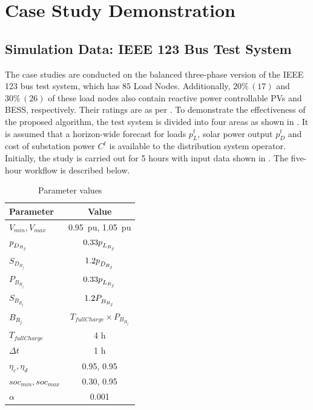 \documentclass[../../outputs/main.tex]{subfiles}
\begin{document}
\section{Case Study Demonstration}

\subsection{Simulation Data: IEEE 123 Bus Test System}
The case studies are conducted on the balanced three-phase version of the IEEE 123 bus test system, which has $85$ Load Nodes. Additionally, $20 \% \, (17)$ and $30 \% \, (26)$ of these load nodes also contain reactive power controllable PVs and BESS, respectively. Their ratings are as per . To demonstrate the effectiveness of the proposed algorithm, the test system is divided into four areas as shown in . It is assumed that a horizon-wide forecast for loads $p^t_L$, solar power output $p^t_D$ and cost of substation power  $C^t$ is available to the distribution system operator. Initially, the study is carried out for 5 hours with input data shown in . The five-hour workflow is described below. 

\def\ds{\rule{0pt}{1.5ex}} %

\begin{table}[t]
    \centering
    \caption{Parameter values}
    \begin{tabular}{|l|c|}
    \hline
    \textbf{Parameter} & \textbf{Value} \\ \hline
    $V_{min}, V_{max}$ & 0.95\, pu, 1.05\, pu \\ \hline
    $p_{\ds D_{R_j}}$ & $0.33 p_{\ds L_{R_j}}$ \\ \hline
    $S_{D_{R_j}}$ & $1.2 p_{\ds D_{R_j}}$ \\ \hline
    $P_{B_{R_j}}$ & $0.33 p_{\ds L_{R_j}}$ \\ \hline
    $S_{B_{R_j}}$ & $1.2 P_{\ds B_{R_j}}$ \\ \hline
    $B_{R_j}$ & $T_{fullCharge} \times P_{B_{R_j}}$ \\ \hline
    $T_{fullCharge}$ & 4 h \\ \hline
    $\Delta t$ & 1 h \\ \hline
    $\eta_c, \eta_d$ & 0.95, 0.95 \\ \hline
    $soc_{min}, soc_{max}$ & 0.30, 0.95 \\ \hline
    $\alpha$ & 0.001 \\ \hline
    \end{tabular}
    \label{table:parameter-values}
\end{table}
\end{document}
